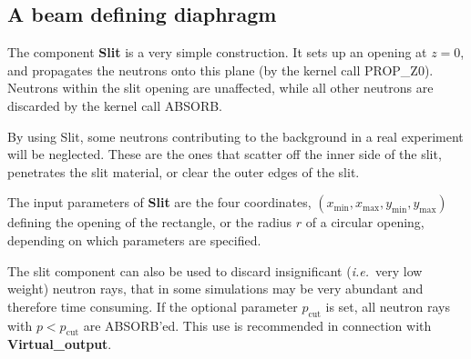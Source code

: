 \subsection*{A beam defining diaphragm}
\label{slit}


The component \textbf{Slit} is a very simple construction.
It sets up an opening at $z=0$, and propagates the neutrons
onto this plane (by the kernel call PROP\_Z0).
Neutrons within the slit opening are unaffected,
while all other neutrons
are discarded by the kernel call ABSORB.

By using \textrm{Slit}, some neutrons contributing to the background
in a real experiment will be neglected.
These are the ones that scatter off the inner side
of the slit, penetrates the slit material,
or clear the outer edges of the slit.

The input parameters of \textbf{Slit} are the four coordinates,
$(x_\textrm{min}, x_\textrm{max}, y_\textrm{min}, y_\textrm{max})$
defining the opening of the rectangle, or the radius $r$ of
a circular opening, depending on which parameters are specified.

The slit component can also be used to discard insignificant 
({\em i.e.}\ very low weight)
neutron rays, that in some simulations may be very abundant and therefore
time consuming. If the optional parameter $p_\textrm{cut}$ is set, all
neutron rays with $p<p_\textrm{cut}$ are ABSORB'ed.
This use is recommended in connection with \textbf{Virtual\_output}.



